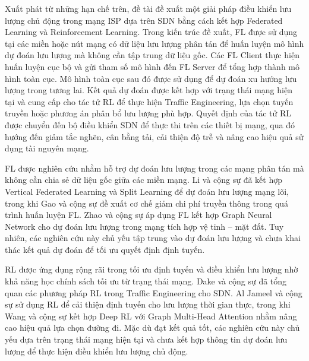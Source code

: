 Xuất phát từ những hạn chế trên, đề tài đề xuất một giải pháp điều khiển lưu lượng chủ động trong mạng ISP dựa trên SDN bằng cách kết hợp Federated Learning và Reinforcement Learning. Trong kiến trúc đề xuất, FL được sử dụng tại các miền hoặc nút mạng có dữ liệu lưu lượng phân tán để huấn luyện mô hình dự đoán lưu lượng mà không cần tập trung dữ liệu gốc. Các FL Client thực hiện huấn luyện cục bộ và gửi tham số mô hình đến FL Server để tổng hợp thành mô hình toàn cục. Mô hình toàn cục sau đó được sử dụng để dự đoán xu hướng lưu lượng trong tương lai. Kết quả dự đoán được kết hợp với trạng thái mạng hiện tại và cung cấp cho tác tử RL để thực hiện Traffic Engineering, lựa chọn tuyến truyền hoặc phương án phân bổ lưu lượng phù hợp. Quyết định của tác tử RL được chuyển đến bộ điều khiển SDN để thực thi trên các thiết bị mạng, qua đó hướng đến giảm tắc nghẽn, cân bằng tải, cải thiện độ trễ và nâng cao hiệu quả sử dụng tài nguyên mạng.

FL được nghiên cứu nhằm hỗ trợ dự đoán lưu lượng trong các mạng phân tán mà không cần chia sẻ dữ liệu gốc giữa các miền mạng. Li và cộng sự \cite{li2024core} đã kết hợp Vertical Federated Learning và Split Learning để dự đoán lưu lượng mạng lõi, trong khi Gao và cộng sự \cite{gao2024communication} đề xuất cơ chế giảm chi phí truyền thông trong quá trình huấn luyện FL. Zhao và cộng sự \cite{zhao2024federated} áp dụng FL kết hợp Graph Neural Network cho dự đoán lưu lượng trong mạng tích hợp vệ tinh – mặt đất. Tuy nhiên, các nghiên cứu này chủ yếu tập trung vào dự đoán lưu lượng và chưa khai thác kết quả dự đoán để tối ưu quyết định định tuyến.

RL được ứng dụng rộng rãi trong tối ưu định tuyến và điều khiển lưu lượng nhờ khả năng học chính sách tối ưu từ trạng thái mạng. Dake và cộng sự \cite{dake2021traffic} đã tổng quan các phương pháp RL trong Traffic Engineering cho SDN. Al Jameel và cộng sự \cite{aljameel2022reinforcement} sử dụng RL để cải thiện định tuyến cho lưu lượng thời gian thực, trong khi Wang và cộng sự \cite{wang2026deep} kết hợp Deep RL với Graph Multi-Head Attention nhằm nâng cao hiệu quả lựa chọn đường đi. Mặc dù đạt kết quả tốt, các nghiên cứu này chủ yếu dựa trên trạng thái mạng hiện tại và chưa kết hợp thông tin dự đoán lưu lượng để thực hiện điều khiển lưu lượng chủ động.

